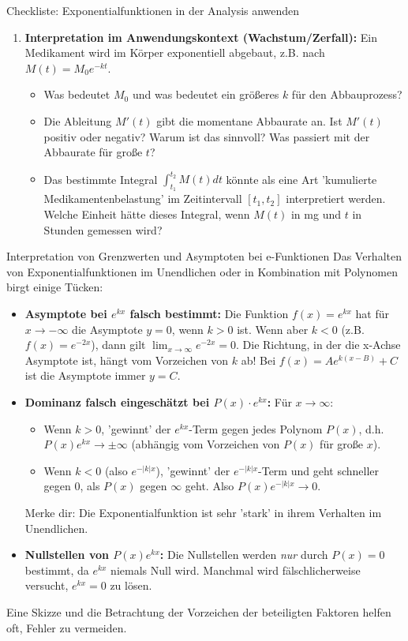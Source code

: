 \begin{aufgabenumgebung}{Checkliste: Exponentialfunktionen in der Analysis anwenden}
\begin{enumerate}[label=(\alph*)]
\begin{itemize}
    \end{itemize}
    \item \textbf{Interpretation im Anwendungskontext (Wachstum/Zerfall):}
    Ein Medikament wird im Körper exponentiell abgebaut, z.B. nach $M(t) = M_0 e^{-kt}$.
    \begin{itemize}
        \item Was bedeutet $M_0$ und was bedeutet ein größeres $k$ für den Abbauprozess?
        \item Die Ableitung $M'(t)$ gibt die momentane Abbaurate an. Ist $M'(t)$ positiv oder negativ? Warum ist das sinnvoll? Was passiert mit der Abbaurate für große $t$?
        \item Das bestimmte Integral $\int_{t_1}^{t_2} M(t) dt$ könnte als eine Art 'kumulierte Medikamentenbelastung' im Zeitintervall $[t_1, t_2]$ interpretiert werden. Welche Einheit hätte dieses Integral, wenn $M(t)$ in mg und $t$ in Stunden gemessen wird?
    \end{itemize}
\end{enumerate}
\end{aufgabenumgebung}

\begin{fehlerboxumgebung}{Interpretation von Grenzwerten und Asymptoten bei e-Funktionen}
Das Verhalten von Exponentialfunktionen im Unendlichen oder in Kombination mit Polynomen birgt einige Tücken:
\begin{itemize}
    \item \textbf{Asymptote bei $e^{kx}$ falsch bestimmt:} Die Funktion $f(x)=e^{kx}$ hat für $x \to -\infty$ die Asymptote $y=0$, wenn $k>0$ ist. Wenn aber $k<0$ (z.B. $f(x)=e^{-2x}$), dann gilt $\lim_{x \to \infty} e^{-2x} = 0$. Die Richtung, in der die x-Achse Asymptote ist, hängt vom Vorzeichen von $k$ ab! Bei $f(x)=A e^{k(x-B)} + C$ ist die Asymptote immer $y=C$.
    \item \textbf{Dominanz falsch eingeschätzt bei $P(x) \cdot e^{kx}$:} Für $x \to \infty$:
        \begin{itemize}
            \item Wenn $k>0$, 'gewinnt' der $e^{kx}$-Term gegen jedes Polynom $P(x)$, d.h. $P(x)e^{kx} \to \pm\infty$ (abhängig vom Vorzeichen von $P(x)$ für große $x$).
            \item Wenn $k<0$ (also $e^{-|k|x}$), 'gewinnt' der $e^{-|k|x}$-Term und geht schneller gegen 0, als $P(x)$ gegen $\infty$ geht. Also $P(x)e^{-|k|x} \to 0$.
        \end{itemize}
    Merke dir: Die Exponentialfunktion ist sehr 'stark' in ihrem Verhalten im Unendlichen.
    \item \textbf{Nullstellen von $P(x)e^{kx}$:} Die Nullstellen werden \textit{nur} durch $P(x)=0$ bestimmt, da $e^{kx}$ niemals Null wird. Manchmal wird fälschlicherweise versucht, $e^{kx}=0$ zu lösen.
\end{itemize}
Eine Skizze und die Betrachtung der Vorzeichen der beteiligten Faktoren helfen oft, Fehler zu vermeiden.
\end{fehlerboxumgebung}